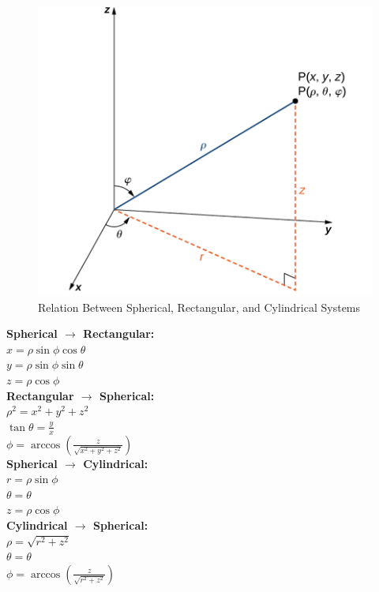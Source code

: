 \documentclass{article}
\begin{document}
            \begin{figure} [hbt!]
                \centering
                \includegraphics[scale=0.6]{Resources/Unit3Vectors/relation.PNG}
                \caption*{Relation Between Spherical, Rectangular, and Cylindrical Systems}
            \end{figure}

            \noindent \textbf{Spherical $\rightarrow$ Rectangular:} \\
            $  x=\rho\sin\phi\cos\theta$ \\
            $  y=\rho\sin\phi\sin\theta$ \\
            $  z=\rho\cos\phi$ \\
            \textbf{Rectangular $\rightarrow$ Spherical:} \\
            $  \rho^2=x^2+y^2+z^2$ \\
            $  \tan\theta=\frac{y}{x}$ \\
            $  \phi=\arccos{(\frac{z}{\sqrt{x^2+y^2+z^2}})}$ \\
            \textbf{Spherical $\rightarrow$ Cylindrical:} \\
            $  r=\rho\sin\phi$ \\
            $  \theta=\theta$ \\
            $  z=\rho\cos\phi$ \\
            \textbf{Cylindrical $\rightarrow$ Spherical:} \\
            $  \rho=\sqrt{r^2+z^2}$ \\
            $  \theta=\theta$ \\
            $  \phi=\arccos{(\frac{z}{\sqrt{r^2+z^2}})}$
\end{document}

